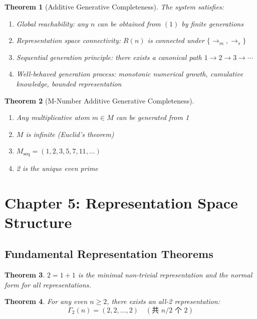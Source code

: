 \documentclass[12pt]{article}
\newtheorem{theorem}{Theorem}[section]
\theoremstyle{definition}
\begin{document}
\begin{theorem}[Additive Generative Completeness]
The system satisfies:
\begin{enumerate}
    \item Global reachability: any \(n\) can be obtained from \((1)\) by finite generations
    \item Representation space connectivity: \(R(n)\) is connected under \(\{\rightarrow_m, \rightarrow_s\}\)
    \item Sequential generation principle: there exists a canonical path \(1 \rightarrow 2 \rightarrow 3 \rightarrow \cdots\)
    \item Well-behaved generation process: monotonic numerical growth, cumulative knowledge, bounded representation
\end{enumerate}
\end{theorem}

\begin{theorem}[M-Number Additive Generative Completeness]
\begin{enumerate}
    \item Any multiplicative atom \(m \in M\) can be generated from 1
    \item \(M\) is infinite (Euclid's theorem)
    \item \(M_{\text{seq}} = (1,2,3,5,7,11,\dots)\)
    \item 2 is the unique even prime
\end{enumerate}
\end{theorem}

\section{Chapter 5: Representation Space Structure}

\subsection{Fundamental Representation Theorems}

\begin{theorem}
\(2=1+1\) is the minimal non-trivial representation and the normal form for all representations.
\end{theorem}

\begin{theorem}
For any even \(n \geq 2\), there exists an all-2 representation:
\[
\Gamma_2(n) = (2,2,\dots,2) \quad (\text{共 } n/2 \text{ 个 } 2)
\]
\end{theorem}
\end{document}
